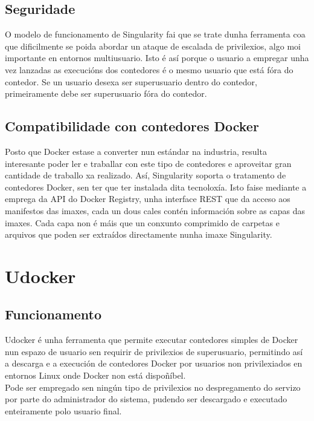 \subsection{Seguridade}

O modelo de funcionamento de Singularity fai que se trate dunha ferramenta coa que dificilmente se poida abordar un ataque de escalada de privilexios, algo moi importante en entornos multiusuario. Isto é así porque o usuario a empregar unha vez lanzadas as execucións dos contedores é o mesmo usuario que está fóra do contedor. Se un usuario desexa ser superusuario dentro do contedor, primeiramente debe ser superusuario fóra do contedor.

\subsection{Compatibilidade con contedores Docker}

Posto que Docker estase a converter nun estándar na industria, resulta interesante poder ler e traballar con este tipo de contedores e aproveitar gran cantidade de traballo xa realizado. Así, Singularity soporta o tratamento de contedores Docker, sen ter que ter instalada dita tecnoloxía. Isto faise  mediante a emprega da \gls{API} do Docker Registry, unha interface \gls{REST} que da acceso aos manifestos das imaxes, cada un dous cales contén información sobre as capas das imaxes. Cada capa non é máis que un conxunto comprimido de carpetas e arquivos que poden ser extraídos directamente nunha imaxe Singularity. \cite{singularityScientificContainers}

\section{Udocker}
\label{introUdocker}

\subsection{Funcionamento}

Udocker é unha ferramenta que permite executar contedores simples de Docker nun espazo de usuario sen requirir de privilexios de superusuario, permitindo así a descarga e a execución de contedores Docker por usuarios non privilexiados en entornos Linux onde Docker non está dispoñíbel.\\

Pode ser empregado sen ningún tipo de privilexios no despregamento do servizo por parte do administrador do sistema, pudendo ser descargado e executado enteiramente polo usuario final.\\

